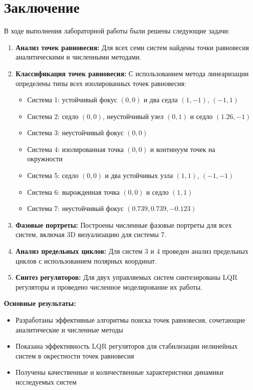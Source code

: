 \section*{Заключение}

В ходе выполнения лабораторной работы были решены следующие задачи:

\begin{enumerate}
\item \textbf{Анализ точек равновесия:} Для всех семи систем найдены точки равновесия аналитическими и численными методами.

\item \textbf{Классификация точек равновесия:} С использованием метода линеаризации определены типы всех изолированных точек равновесия:
\begin{itemize}
\item Система 1: устойчивый фокус $(0,0)$ и два седла $(1,-1)$, $(-1,1)$
\item Система 2: седло $(0,0)$, неустойчивый узел $(0,1)$ и седло $(1.26,-1)$
\item Система 3: неустойчивый фокус $(0,0)$
\item Система 4: изолированная точка $(0,0)$ и континуум точек на окружности
\item Система 5: седло $(0,0)$ и два устойчивых узла $(1,1)$, $(-1,-1)$
\item Система 6: вырожденная точка $(0,0)$ и седло $(1,1)$
\item Система 7: неустойчивый фокус $(0.739, 0.739, -0.123)$
\end{itemize}

\item \textbf{Фазовые портреты:} Построены численные фазовые портреты для всех систем, включая 3D визуализацию для системы 7.

\item \textbf{Анализ предельных циклов:} Для систем 3 и 4 проведен анализ предельных циклов с использованием полярных координат.

\item \textbf{Синтез регуляторов:} Для двух управляемых систем синтезированы LQR регуляторы и проведено численное моделирование их работы.
\end{enumerate}

\textbf{Основные результаты:}

\begin{itemize}
\item Разработаны эффективные алгоритмы поиска точек равновесия, сочетающие аналитические и численные методы
\item Показана эффективность LQR регуляторов для стабилизации нелинейных систем в окрестности точек равновесия
\item Получены качественные и количественные характеристики динамики исследуемых систем
\end{itemize}

